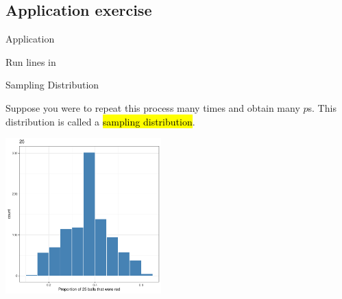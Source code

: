\documentclass[notes,11pt, aspectratio=169]{beamer}
\begin{document}

\subsection{Application exercise}



\begin{frame}{Application}

\begin{center}
\large
Run lines \color{blue}{1-26} in 
\end{center}

\end{frame}

\begin{frame}{Sampling Distribution}

Suppose you were to repeat this process many times and obtain many $\hat{p}$s. This distribution is called a \hl{sampling distribution}.

\begin{center}
\includegraphics[width=0.45\textwidth]{graphs/l05f03.pdf}
\end{center}

\end{frame}
\end{document}

